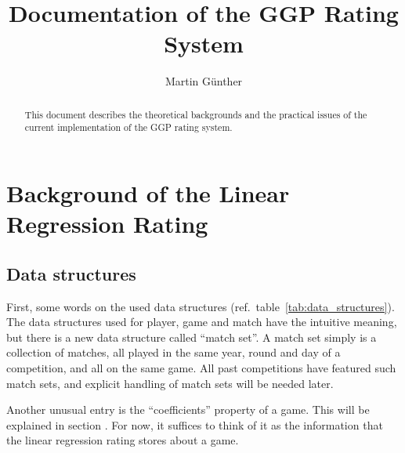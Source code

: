 \documentclass[a4paper,10pt]{article}
\title{Documentation of the GGP Rating System}
\author{Martin Günther}
\begin{document}
\maketitle

\begin{abstract}
This document describes the theoretical backgrounds and the practical issues of the current
implementation of the GGP rating system.
\end{abstract}

\section{Background of the Linear Regression Rating}

\subsection{Data structures}
First, some words on the used data structures (ref.\ table~\ref{tab:data_structures}).
The data structures used for player, game and match have the intuitive meaning, but there
is a new data structure called ``match set''. A match set simply is a collection of matches,
all played in the same year, round and day of a competition, and all on the same game.
All past competitions have featured such match sets, and explicit handling of match sets
will be needed later.

Another unusual entry is the  ``coefficients'' property of a game. This will be explained in section %
. For now, it suffices to think of it as the information that the linear regression rating stores about a game.
\end{document}
